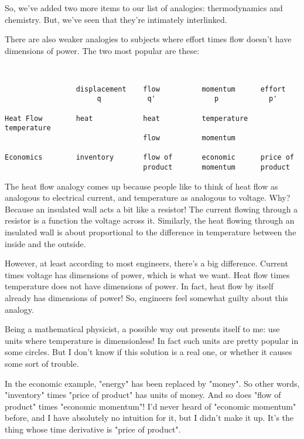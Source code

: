 So, we've added two more items to our list of analogies: thermodynamics
and chemistry.  But, we've seen that they're intimately interlinked.

There are also weaker analogies to subjects where effort times flow
doesn't have dimensions of power.  The two most popular are these:


\begin{verbatim}

    
                 displacement    flow          momentum      effort
                      q           q'              p            p'

Heat Flow        heat            heat          temperature   temperature 
                                 flow          momentum

Economics        inventory       flow of       economic      price of
                                 product       momentum      product

\end{verbatim}
    

The heat flow analogy comes up because people like to think of heat
flow as analogous to electrical current, and temperature as analogous
to voltage.  Why?  Because an insulated wall acts a bit like a
resistor!  The current flowing through a resistor is a function the
voltage across it.  Similarly, the heat flowing through an insulated
wall is about proportional to the difference in temperature between
the inside and the outside.

However, at least according to most engineers, there's a big
difference.  Current times voltage has dimensions of power, which is
what we want.  Heat flow times temperature does not have dimensions of
power.  In fact, heat flow by itself already has dimensions of power!
So, engineers feel somewhat guilty about this analogy.

Being a mathematical physicist, a possible way out presents itself to
me: use units where temperature is dimensionless!  In fact such units
are pretty popular in some circles.  But I don't know if this solution
is a real one, or whether it causes some sort of trouble.

In the economic example, "energy" has been replaced by
"money".  So other words, "inventory" times
"price of product" has units of money.  And so does
"flow of product" times "economic momentum"!  I'd
never heard of "economic momentum" before, and I have
absolutely no intuition for it, but I didn't make it up.  It's the
thing whose time derivative is "price of product".

